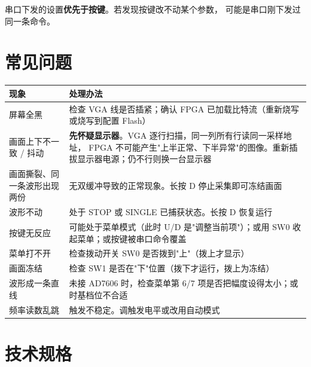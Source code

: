 \documentclass[UTF8,a4paper,11pt]{ctexart}
\begin{document}
\begin{tipbox}
串口下发的设置\textbf{优先于按键}。若发现按键改不动某个参数，
可能是串口刚下发过同一条命令。
\end{tipbox}

\section{常见问题}

\begin{center}
\small
\begin{tabular}{p{5.2cm}p{9.2cm}}
\toprule
现象 & 处理办法\\
\midrule
屏幕全黑 & 检查 VGA 线是否插紧；确认 FPGA 已加载比特流（重新烧写或烧写到配置 Flash）\\
画面上下不一致 / 抖动 & \textbf{先怀疑显示器}。VGA 逐行扫描，同一列所有行读同一采样地址，
FPGA 不可能产生"上半正常、下半异常"的图像。重新插拔显示器电源；仍不行则换一台显示器\\
画面撕裂、同一条波形出现两份 & 无双缓冲导致的正常现象。长按 D 停止采集即可冻结画面\\
波形不动 & 处于 STOP 或 SINGLE 已捕获状态。长按 D 恢复运行\\
按键无反应 & 可能处于菜单模式（此时 U/D 是"调整当前项"）；或用 SW0 收起菜单；或按键被串口命令覆盖\\
菜单打不开 & 检查拨动开关 SW0 是否拨到"上"（拨上才显示）\\
画面冻结 & 检查 SW1 是否在"下"位置（拨下才运行，拨上为冻结）\\
波形成一条直线 & 未接 AD7606 时，检查菜单第 6/7 项是否把幅度设得太小；或时基档位不合适\\
频率读数乱跳 & 触发不稳定。调触发电平或改用自动模式\\
\bottomrule
\end{tabular}
\end{center}

\appendix
\section{技术规格}
\end{document}
